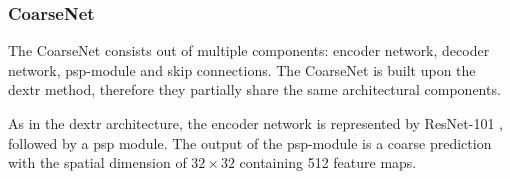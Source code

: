 \subsubsection{CoarseNet}
The CoarseNet consists out of multiple components: encoder network, decoder network, \gls{psp}-module and skip connections. The CoarseNet is built upon the \gls{dextr} method, therefore they partially share the same architectural components. 

As in the \gls{dextr} architecture, the encoder network is represented by ResNet-101 \cite{He16-ResNet}, followed by a \gls{psp} module.
The output of the \gls{psp}-module is a coarse prediction with the spatial dimension of  $32 \times 32$  containing 512 feature maps. 

